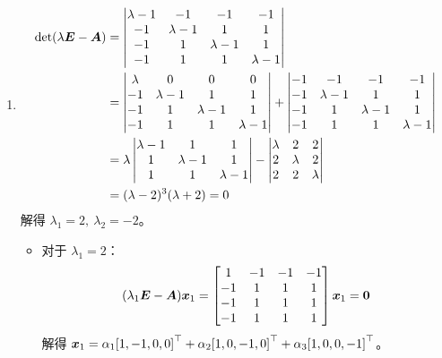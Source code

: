 \begin{problem}
\begin{solution}
\begin{enumerate}
			\item[\textbf{3)}]
			$$
			\begin{aligned}
				\det(\lambda \boldsymbol{E} - \boldsymbol{A}) & = \begin{vmatrix}
					\lambda - 1 & -1 & -1 & -1 \\
					-1 & \lambda - 1 & 1 & 1 \\
					-1 & 1 & \lambda - 1 & 1 \\
					-1 & 1 & 1 & \lambda - 1
				\end{vmatrix} \\
				& = \begin{vmatrix}
					\lambda & 0 & 0 & 0 \\
					-1 & \lambda - 1 & 1 & 1 \\
					-1 & 1 & \lambda - 1 & 1 \\
					-1 & 1 & 1 & \lambda - 1
				\end{vmatrix} + \begin{vmatrix}
					-1 & -1 & -1 & -1 \\
					-1 & \lambda - 1 & 1 & 1 \\
					-1 & 1 & \lambda - 1 & 1 \\
					-1 & 1 & 1 & \lambda - 1
				\end{vmatrix} \\
				& = \lambda \begin{vmatrix}
					\lambda - 1 & 1 & 1 \\
					1 & \lambda - 1 & 1 \\
					1 & 1 & \lambda - 1
				\end{vmatrix} - \begin{vmatrix}
					\lambda & 2 & 2 \\
					2 & \lambda & 2 \\
					2 & 2 & \lambda
				\end{vmatrix} \\
				& = (\lambda - 2)^3 (\lambda + 2) = 0
			\end{aligned}
			$$
			解得 $\lambda_1 = 2,\ \lambda_2 = -2$。

			\begin{itemize}
				\item 对于 $\lambda_1 = 2$：
				$$
				(\lambda_1 \boldsymbol{E} - \boldsymbol{A}) \boldsymbol{x}_1 = \begin{bmatrix}
					1 & -1 & -1 & -1 \\
					-1 & 1 & 1 & 1 \\
					-1 & 1 & 1 & 1 \\
					-1 & 1 & 1 & 1
				\end{bmatrix} \boldsymbol{x}_1 = \boldsymbol{0}
				$$
				解得 $\boldsymbol{x}_1 = \alpha_1 {[1, -1, 0, 0]}^\top + \alpha_2 {[1, 0, -1, 0]}^\top + \alpha_3 {[1, 0, 0, -1]}^\top$。


\end{itemize}
\end{enumerate}
\end{solution}
\end{problem}
